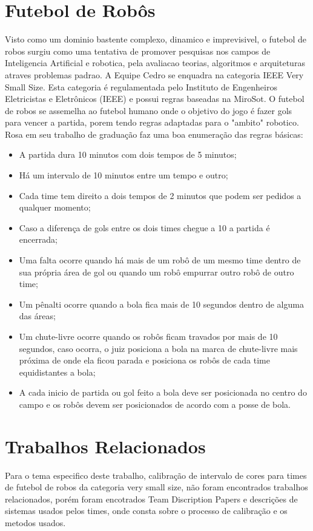 \section{Futebol de Robôs}
 Visto como um dominio bastente complexo, dinamico e imprevisivel\cite{Costa:2000}, o futebol de robos surgiu como uma tentativa de promover pesquisas nos campos de Inteligencia Artificial e robotica, pela avaliacao teorias, algoritmos e arquiteturas atraves problemas padrao\cite{Kitano:1997}.
 A Equipe Cedro se enquadra na categoria IEEE Very Small Size. Esta categoria é regulamentada pelo Instituto de Engenheiros Eletricistas e Eletrônicos (IEEE) e possui regras baseadas na MiroSot\cite{Rosa:2015}. O futebol de robos se assemelha ao futebol humano onde o objetivo do jogo é fazer gols para vencer a partida, porem tendo regras adaptadas para o "ambito" robotico. 
 Rosa\cite{Rosa:2015} em seu trabalho de graduação faz uma boa enumeração das regras básicas:
 \begin{itemize}
 \item A partida dura 10 minutos com dois tempos de 5 minutos;
  \item Há um intervalo de 10 minutos entre um tempo e outro;
   \item Cada time tem direito a dois tempos de 2 minutos que podem ser pedidos a qualquer
   momento;
    \item Caso a diferença de gols entre os dois times chegue a 10 a partida é encerrada;
     \item Uma falta ocorre quando há mais de um robô de um mesmo time dentro de sua própria
     área de gol ou quando um robô empurrar outro robô de outro time;
     \item Um pênalti ocorre quando a bola fica mais de 10 segundos dentro de alguma das áreas;
     \item Um chute-livre ocorre quando os robôs ficam travados por mais de 10 segundos, caso
     ocorra, o juiz posiciona a bola na marca de chute-livre mais próxima de onde ela ficou
     parada e posiciona os robôs de cada time equidistantes a bola;
     \item A cada inicio de partida ou gol feito a bola deve ser posicionada no centro do campo e os
     robôs devem ser posicionados de acordo com a posse de bola.
 \end{itemize}

\section{Trabalhos Relacionados}
Para o tema especifico deste trabalho, calibração de intervalo de cores para times de futebol de robos da categoria very small size, não foram encontrados trabalhos relacionados, porém foram encotrados Team Discription Papers e descrições de sistemas usados pelos times, onde consta sobre o processo de calibração e os metodos usados.

